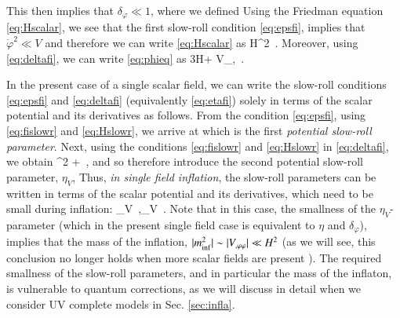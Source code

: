 \be
\label{eq:etafi}
\setlength\fboxsep{0.25cm}
\setlength\fboxrule{0.4pt}
\ee
This then implies that $\delta_\varphi\ll1$, where we defined 
\be
\label{eq:deltafi}
\setlength\fboxsep{0.25cm}
\setlength\fboxrule{0.4pt}
\ee
 Using the Friedman equation \eqref{eq:Hscalar}, we  see that the first slow-roll condition \eqref{eq:epsfi}, implies
that $\dot\varphi^2 \ll V$ and therefore we can write \eqref{eq:Hscalar} as
\be
\label{eq:Hslowr}
H^2 \simeq {} \,.
\ee
Moreover, using \eqref{eq:deltafi}, we can write \eqref{eq:phieq} as
\be
\label{eq:fislowr}
3H\dot \varphi + V_{,\varphi} \,.
 \ee

In the present case of a single scalar field, we can write the slow-roll conditions \eqref{eq:epsfi} and \eqref{eq:deltafi} (equivalently \eqref{eq:etafi}) solely in terms of the scalar potential and its derivatives as follows.  From the condition \eqref{eq:epsfi}, using \eqref{eq:fislowr} and \eqref{eq:Hslowr}, we arrive at
\be\label{eq:epsV}
\setlength\fboxsep{0.25cm}
\setlength\fboxrule{0.4pt}
\ee
which is the first {\em potential slow-roll parameter}.
Next, using the conditions \eqref{eq:fislowr} and  \eqref{eq:Hslowr} in \eqref{eq:deltafi}, we obtain
\be
\Mp^2  + \epsilon {}\,,
\ee
and so therefore introduce the second potential slow-roll parameter,  $\eta_V$,
\be\label{eq:etaV}
\setlength\fboxsep{0.25cm}
\setlength\fboxrule{0.4pt}
\ee
Thus, {\em in single field inflation}, the slow-roll parameters can be written in terms of the scalar potential and its derivatives, which need to be  small during  inflation:
\be
\epsilon_V  \,,\qquad \eta_V \,.
\ee
Note that in this case, the smallness of the $\eta_V$-parameter (which in the present single field case is equivalent to $\eta$ and $\delta_\varphi$),  implies that the mass of the inflation, $|m_{\rm inf}^2| \sim |V_{,\varphi\varphi}| \ll H^2$ 
(as we will see, this conclusion no longer holds when more scalar fields are present \cite{Chakraborty:2019dfh,Aragam:2021scu}). The required smallness of the slow-roll parameters, and in particular the mass of the inflaton, is vulnerable to quantum corrections, as we will discuss in detail when we consider UV complete models in Sec. \ref{sec:infla}.

